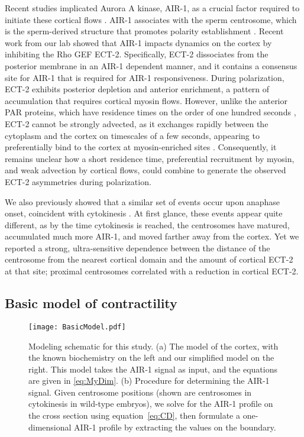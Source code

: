 \documentclass[11pt]{article}
\begin{document}
Recent studies implicated Aurora A kinase, AIR-1, as a crucial factor required to initiate these cortical flows \citep{klinkert2019aurora,kapoor2019centrosome, longhini2022aurora}. AIR-1 associates with the sperm centrosome, which is the sperm-derived structure that promotes polarity establishment \citep{hannak2001aurora}. Recent work from our lab \citep{longhini2022aurora} showed that AIR-1 impacts dynamics on the cortex by inhibiting the Rho GEF ECT-2. Specifically, ECT-2 dissociates from the posterior membrane in an AIR-1 dependent manner, and it contains a consensus site for AIR-1 that is required for AIR-1 responsiveness. During polarization, ECT-2 exhibits posterior depletion and anterior enrichment, a pattern of accumulation that requires cortical myosin flows. However, unlike the anterior PAR proteins, which have residence times on the order of one hundred seconds \citep{robin2014single}, ECT-2 cannot be strongly advected, as it exchanges rapidly between the cytoplasm and the cortex on timescales of a few seconds, appearing to preferentially bind to the cortex at myosin-enriched sites \citep{longhini2022aurora}. Consequently, it remains unclear how a short residence time, preferential recruitment by myosin, and weak advection by cortical flows, could combine to generate the observed ECT-2 asymmetries during polarization. 

We also previously showed that a similar set of events occur upon anaphase onset, coincident with cytokinesis \citep{longhini2022aurora}. At first glance, these events appear quite different, as by the time cytokinesis is reached, the centrosomes have matured,  accumulated much more \mbox{AIR-1}, and moved farther away from the cortex. Yet we reported a strong, ultra-sensitive dependence between the distance of the centrosome from the nearest cortical domain and the amount of cortical ECT-2 at that site; proximal centrosomes correlated with a reduction in cortical ECT-2. 


\subsection{Basic model of contractility}

\begin{figure}
\centering
\texttt{[image: BasicModel.pdf]}
\caption{\label{fig:ModelSch}Modeling schematic for this study. (a) The model of the cortex, with the known biochemistry on the left and our simplified model on the right. This model takes the AIR-1 signal as input, and the equations are given in \eqref{eq:MyDim}. (b) Procedure for determining the AIR-1 signal. Given centrosome positions (shown are centrosomes in cytokinesis in wild-type embryos), we solve for the AIR-1 profile on the cross section using equation\ \eqref{eq:CD}, then formulate a one-dimensional AIR-1 profile by extracting the values on the boundary.}
\end{figure}
\end{document}
